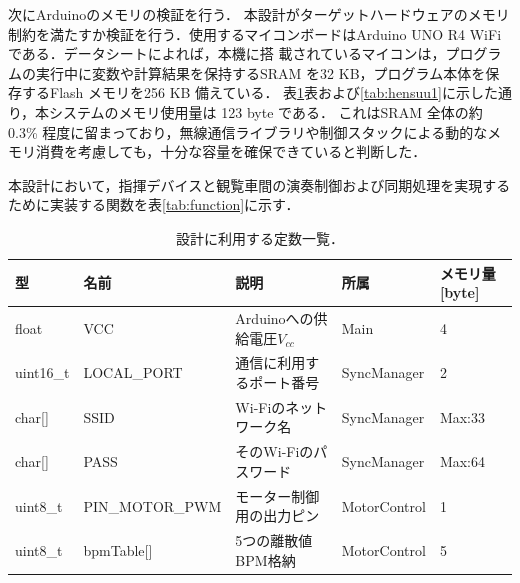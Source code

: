 \documentclass[lualatex,book,paper=a4paper,jafontsize=11.5pt,jafontscale=1.05]{jlreq}
\begin{document}
次にArduinoのメモリの検証を行う．
本設計がターゲットハードウェアのメモリ制約を満たすか検証を行う．使用するマイコンボードはArduino UNO R4 WiFi である．データシートによれば，本機に搭
載されているマイコンは，プログラムの実行中に変数や計算結果を保持するSRAM を32 KB，プログラム本体を保存するFlash メモリを256 KB 備えている\cite{ref:Arduino_memori}．
表\ref{tab:teisuu}表および\ref{tab:hensuu1}に示した通り，本システムのメモリ使用量は 123 byte である．
これはSRAM 全体の約0.3\% 程度に留まっており，無線通信ライブラリや制御スタックによる動的なメモリ消費を考慮しても，十分な容量を確保できていると判断した．



本設計において，指揮デバイスと観覧車間の演奏制御および同期処理を実現するために実装する関数を表\ref{tab:function}に示す．

\begin{table}[H]
\centering
\caption{設計に利用する定数一覧．}
\label{tab:teisuu}
\begin{tabular}{lllll}
\hline
型 & 名前 & 説明 & 所属 & メモリ量 [byte] \\
\hline
float & VCC & Arduinoへの供給電圧$V_{cc}$ & Main & 4 \\
uint16\_t & LOCAL\_PORT & 通信に利用するポート番号 & SyncManager & 2 \\
char[] & SSID & Wi-Fiのネットワーク名 & SyncManager & Max:33 \\
char[] & PASS & そのWi-Fiのパスワード & SyncManager & Max:64 \\
uint8\_t & PIN\_MOTOR\_PWM & モーター制御用の出力ピン & MotorControl & 1 \\
uint8\_t & bpmTable[] & 5つの離散値BPM格納 & MotorControl & 5 \\
\hline
\end{tabular}
\end{table}


\end{document}
